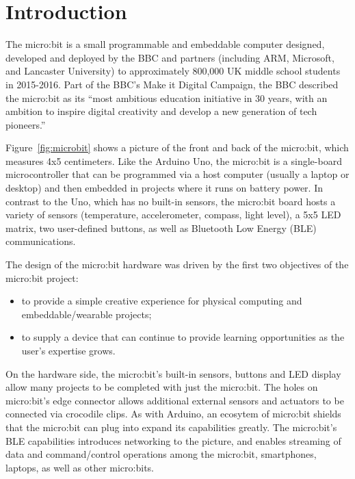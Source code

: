 \section{Introduction}



The micro:bit is a small programmable and embeddable computer designed, 
developed and deployed by the BBC and partners (including ARM, Microsoft, 
and Lancaster University) to approximately 800,000 UK middle school students
in 2015-2016. Part of the BBC's Make it Digital Campaign, the BBC described the
micro:bit as its ``most ambitious education initiative in 30 years, 
with an ambition to inspire digital creativity and 
develop a new generation of tech pioneers.''~\cite{BBCwebsite}



Figure~\ref{fig:microbit} shows a picture of the front and back of the
micro:bit, which measures 4x5 centimeters. Like the Arduino Uno,
the micro:bit is a single-board microcontroller that can be programmed
via a host computer (usually a laptop or desktop)
and then embedded in projects where it runs on battery power.
In contrast to the Uno, which has no built-in sensors, the micro:bit 
board hosts a variety of sensors (temperature, accelerometer, compass, light level), 
a 5x5 LED matrix, two user-defined buttons, as well as Bluetooth
Low Energy (BLE) communications.

The design of the micro:bit hardware was driven by the
first two objectives of the micro:bit project:
\begin{itemize}
\item to provide a simple creative experience for physical computing and embeddable/wearable projects;
\item to supply a device that can continue to provide learning opportunities as the user's expertise grows.
\end{itemize}

On the hardware side, the micro:bit's built-in sensors, buttons and LED display 
allow many projects to be completed with just the micro:bit. The holes on micro:bit's edge
connector allows additional external sensors and actuators to be connected via crocodile clips.
As with Arduino, an ecosytem of micro:bit shields that the micro:bit can plug into expand
its capabilities greatly. The micro:bit's BLE capabilities introduces networking to the
picture, and enables streaming of data and command/control operations among the micro:bit, 
smartphones, laptops, as well as other micro:bits.

